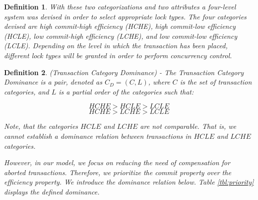 \documentclass[conference]{IEEEtran}
\newtheorem{definition}{Definition}
\begin{document}
\begin{definition}
With these two categorizations and two attributes a four-level system was devised in order to select appropriate lock types. The four categories devised are \textit{high commit-high efficiency (HCHE)}, \textit{high commit-low efficiency (HCLE)}, \textit{low commit-high efficiency (LCHE)}, and \textit{low commit-low efficiency (LCLE)}. Depending on the level in which the transaction has been placed, different lock types will be granted in order to perform concurrency control.

\end{definition}

\begin{definition}
\label{cat_dominance}
(Transaction Category Dominance) - The Transaction Category Dominance is a pair, denoted as $C_{D} = (C,L)$, where $C$ is the set of transaction categories, and $L$ is a partial order of the categories such that:
 
\[\textrm{$HCHE > HCLE > LCLE$}\]
\[\textrm{$HCHE > LCHE > LCLE$} \]

\begin{figure}[h]
\captionsetup{justification=centering}
\centering %


\label{fig:category_lattice} %

\end{figure}

Note, that the categories $HCLE$ and $LCHE$ are not comparable. That is, we cannot establish a dominance relation between transactions in $HCLE$ and $LCHE$ categories.

However, in our model, we focus on reducing the need of compensation for aborted transactions. Therefore, we prioritize the commit property over the efficiency property. We introduce the dominance relation below. Table \ref{tbl:priority} displays the defined dominance.


\end{definition}
\end{document}
